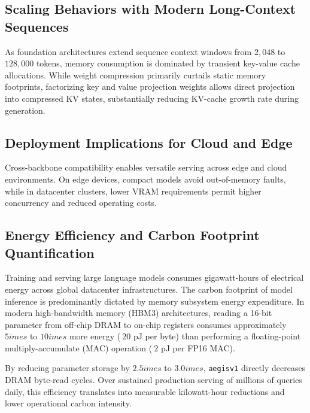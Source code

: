 \subsection{Scaling Behaviors with Modern Long-Context Sequences}
As foundation architectures extend sequence context windows from $2{,}048$ to $128{,}000$ tokens, memory consumption is dominated by transient key-value cache allocations. While weight compression primarily curtails static memory footprints, factorizing key and value projection weights allows direct projection into compressed KV states, substantially reducing KV-cache growth rate during generation.

\subsection{Deployment Implications for Cloud and Edge}
Cross-backbone compatibility enables versatile serving across edge and cloud environments. On edge devices, compact models avoid out-of-memory faults, while in datacenter clusters, lower VRAM requirements permit higher concurrency and reduced operating costs.

\subsection{Energy Efficiency and Carbon Footprint Quantification}
Training and serving large language models consumes gigawatt-hours of electrical energy across global datacenter infrastructures. The carbon footprint of model inference is predominantly dictated by memory subsystem energy expenditure. In modern high-bandwidth memory (HBM3) architectures, reading a 16-bit parameter from off-chip DRAM to on-chip registers consumes approximately $5	imes$ to $10	imes$ more energy ($~20$ pJ per byte) than performing a floating-point multiply-accumulate (MAC) operation ($~2$ pJ per FP16 MAC).

By reducing parameter storage by $2.5	imes$ to $3.0	imes$, \texttt{aegisv1} directly decreases DRAM byte-read cycles. Over sustained production serving of millions of queries daily, this efficiency translates into measurable kilowatt-hour reductions and lower operational carbon intensity.
